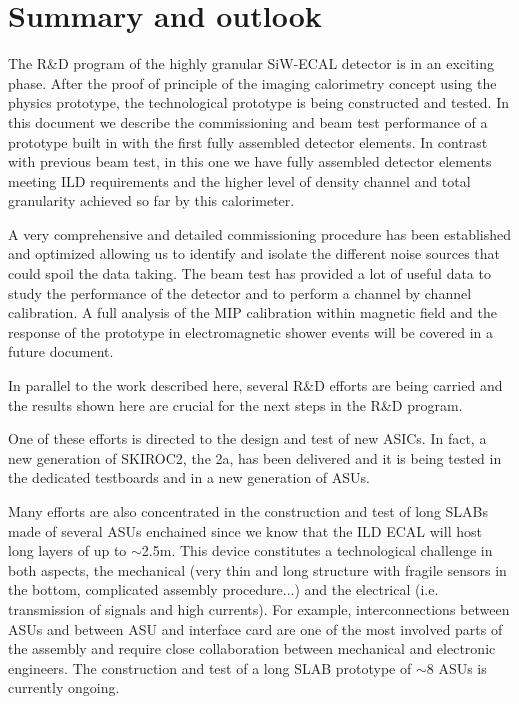 \documentclass[final,3p,times,twocolumn]{elsarticle}
\begin{document}
\section{Summary  and outlook}
\label{sec:summary}

The R\&D program of the highly granular SiW-ECAL detector is in an exciting phase. 
After the proof of principle of the imaging calorimetry concept using the physics prototype, the 
technological prototype is being constructed and tested. In this document we describe the commissioning and
beam test performance of a prototype built in with the first fully assembled
detector elements. In contrast with previous beam test, in this one we have fully
assembled detector elements meeting ILD requirements and the higher level of
density channel and total granularity achieved so far by this calorimeter.

A very comprehensive and detailed commissioning procedure has been established and optimized
allowing us to identify and isolate the different noise sources that could spoil the data taking.
The beam test has provided a lot of useful data to study 
the performance of the detector and  to perform
a channel by channel calibration.
A full analysis of the MIP calibration within magnetic field and
the response of the prototype in electromagnetic shower events
will be covered in a future document.

In parallel to the work described here, several R\&D efforts are being carried
and the results shown here are crucial for the next steps in the R\&D program.

One of these efforts is directed to the design and test of new ASICs.
In fact, a new generation of SKIROC2, the 2a, has been delivered
and it is being tested in the dedicated testboards and in a new generation of ASUs.

Many efforts are also concentrated in the construction and test of long SLABs
made of several ASUs enchained since we know that the ILD ECAL will host long layers of up to $\sim$2.5m.
This device constitutes a technological challenge in both aspects, the mechanical
(very thin and long structure with fragile sensors in the bottom, complicated assembly procedure...)
and the electrical (i.e. transmission of signals and high currents).
For example, interconnections between ASUs and between ASU and interface card are one of
the most involved parts of the assembly
and require close collaboration between mechanical and electronic engineers.
The construction and test of a long SLAB prototype
of $\sim8$ ASUs is currently ongoing.
\end{document}
